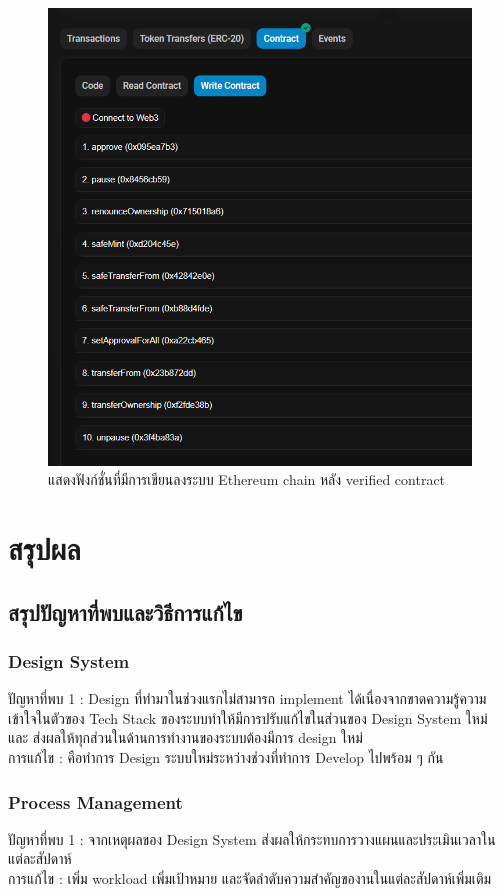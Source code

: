 \documentclass[12pt,oneside,openright,a4paper]{cpe-thai-project}
\begin{document}
\begin{figure}[!thb]
			\centering
			\includegraphics[scale=0.5]{etherscanWrite}
			\caption{แสดงฟังก์ชั่นที่มีการเขียนลงระบบ Ethereum chain หลัง verified contract}
		\end{figure}
\chapter{สรุปผล}
\section{ สรุปปัญหาที่พบและวิธีการแก้ไข}
\subsection{Design System}
\tab ปัญหาที่พบ 1 : Design ที่ทำมาในช่วงแรกไม่สามารถ implement ได้เนื่องจากขาดความรู้ความเข้าใจในตัวของ Tech Stack ของระบบทำให้มีการปรับแก้ไขในส่วนของ Design System ใหม่ และ ส่งผลให้ทุกส่วนในด้านการทำงานของระบบต้องมีการ design ใหม่\\
\tab การแก้ไข : คือทำการ Design ระบบใหม่ระหว่างช่วงที่ทำการ Develop ไปพร้อม ๆ กัน\\

\subsection{Process Management}
\tab ปัญหาที่พบ 1 : จากเหตุผลของ Design System ส่งผลให้กระทบการวางแผนและประเมินเวลาในแต่ละสัปดาห์ \\
\tab การแก้ไข : เพิ่ม workload เพิ่มเป้าหมาย และจัดลำดับความสำคัญของานในแต่ละสัปดาห์เพิ่มเติม \\
\end{document}
